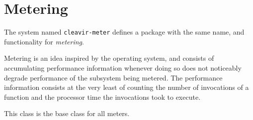 \chapter{Metering}

The system named \texttt{cleavir-meter} defines a package with the
same name, and functionality for \emph{metering}. 

Metering is an idea inspired by the \multics{} operating system, and
consists of accumulating performance information whenever doing so
does not noticeably degrade performance of the subsystem being
metered.  The performance information consists at the very least of
counting the number of invocations of a function and the processor
time the invocations took to execute.


This class is the base class for all meters.
